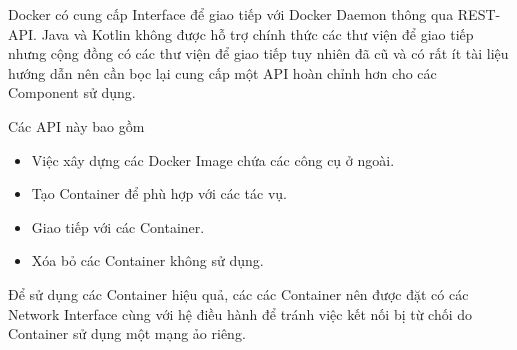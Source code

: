 \documentclass[./../main.tex]{subfiles}
\begin{document}
Docker có cung cấp Interface để giao tiếp với Docker Daemon thông qua REST-API. Java và Kotlin không được hỗ trợ chính thức các thư viện để giao tiếp nhưng cộng đồng có các thư viện để giao tiếp tuy nhiên đã cũ và có rất ít tài liệu hướng dẫn nên cần bọc lại cung cấp một API hoàn chỉnh hơn cho các Component sử dụng.

Các API này bao gồm
\begin{itemize}
	\item Việc xây dựng các Docker Image chứa các công cụ ở ngoài.
	\item Tạo Container để phù hợp với các tác vụ.
	\item Giao tiếp với các Container.
	\item Xóa bỏ các Container không sử dụng.
\end{itemize}

Để sử dụng các Container hiệu quả, các các Container nên được đặt có các Network Interface cùng với hệ điều hành để tránh việc kết nối bị từ chối do Container sử dụng một mạng ảo riêng.
\end{document}
